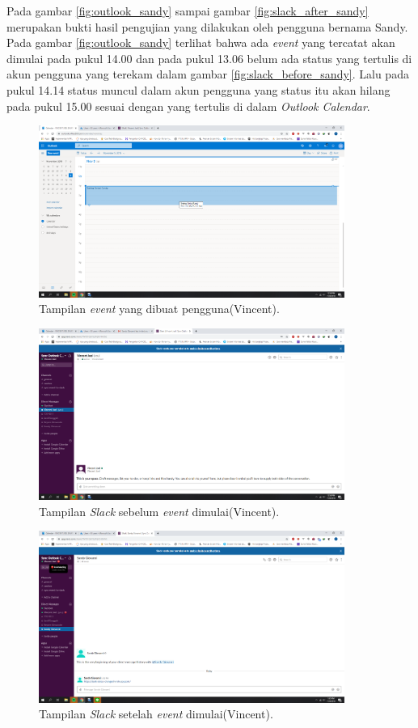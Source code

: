 Pada gambar \ref{fig:outlook_sandy} sampai gambar \ref{fig:slack_after_sandy} merupakan bukti hasil pengujian yang dilakukan oleh pengguna bernama Sandy. Pada gambar \ref{fig:outlook_sandy} terlihat bahwa ada \textit{event} yang tercatat akan dimulai pada pukul 14.00 dan pada pukul 13.06 belum ada status yang tertulis di akun pengguna yang terekam dalam gambar \ref{fig:slack_before_sandy}. Lalu pada pukul 14.14 status muncul dalam akun pengguna yang status itu akan hilang pada pukul 15.00 sesuai dengan yang tertulis di dalam \textit{Outlook Calendar}. 
\clearpage

\begin{figure}[h]
  \includegraphics[width=10cm]{./Gambar/PengujianVincent/Outlook.png}
  \centering
  \caption{Tampilan \textit{event} yang dibuat pengguna(Vincent).}
  \label{fig:outlook_vincent}
\end{figure}

\begin{figure}[h]
  \includegraphics[width=10cm]{./Gambar/PengujianVincent/Slack_Before.png}
  \centering
  \caption{Tampilan \textit{Slack} sebelum \textit{event} dimulai(Vincent).}
  \label{fig:slack_before_vincent}
\end{figure}

\begin{figure}[h]
  \includegraphics[width=10cm]{./Gambar/PengujianVincent/Slack_After.png}
  \centering
  \caption{Tampilan \textit{Slack} setelah \textit{event} dimulai(Vincent).}
  \label{fig:slack_after_vincent}
\end{figure}

